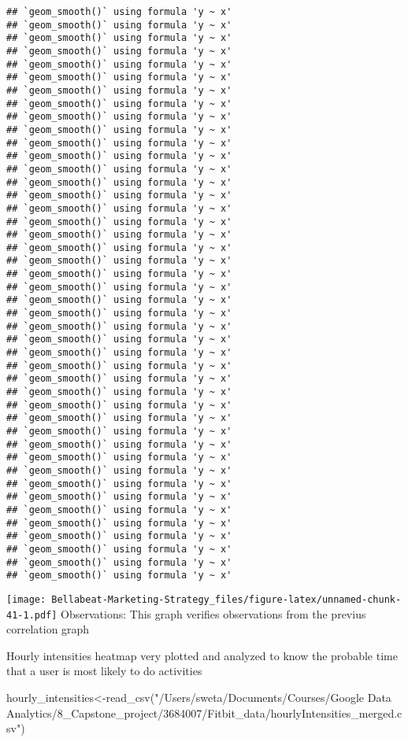 \documentclass[
]{article}
\newenvironment{Shaded}{\begin{snugshade}}{\end{snugshade}}
\newcommand{\FunctionTok}[1]{\textcolor[rgb]{0.00,0.00,0.00}{#1}}
\newcommand{\NormalTok}[1]{#1}
\newcommand{\OtherTok}[1]{\textcolor[rgb]{0.56,0.35,0.01}{#1}}
\newcommand{\StringTok}[1]{\textcolor[rgb]{0.31,0.60,0.02}{#1}}
\begin{document}
\begin{verbatim}
## `geom_smooth()` using formula 'y ~ x'
## `geom_smooth()` using formula 'y ~ x'
## `geom_smooth()` using formula 'y ~ x'
## `geom_smooth()` using formula 'y ~ x'
## `geom_smooth()` using formula 'y ~ x'
## `geom_smooth()` using formula 'y ~ x'
## `geom_smooth()` using formula 'y ~ x'
## `geom_smooth()` using formula 'y ~ x'
## `geom_smooth()` using formula 'y ~ x'
## `geom_smooth()` using formula 'y ~ x'
## `geom_smooth()` using formula 'y ~ x'
## `geom_smooth()` using formula 'y ~ x'
## `geom_smooth()` using formula 'y ~ x'
## `geom_smooth()` using formula 'y ~ x'
## `geom_smooth()` using formula 'y ~ x'
## `geom_smooth()` using formula 'y ~ x'
## `geom_smooth()` using formula 'y ~ x'
## `geom_smooth()` using formula 'y ~ x'
## `geom_smooth()` using formula 'y ~ x'
## `geom_smooth()` using formula 'y ~ x'
## `geom_smooth()` using formula 'y ~ x'
## `geom_smooth()` using formula 'y ~ x'
## `geom_smooth()` using formula 'y ~ x'
## `geom_smooth()` using formula 'y ~ x'
## `geom_smooth()` using formula 'y ~ x'
## `geom_smooth()` using formula 'y ~ x'
## `geom_smooth()` using formula 'y ~ x'
## `geom_smooth()` using formula 'y ~ x'
## `geom_smooth()` using formula 'y ~ x'
## `geom_smooth()` using formula 'y ~ x'
## `geom_smooth()` using formula 'y ~ x'
## `geom_smooth()` using formula 'y ~ x'
## `geom_smooth()` using formula 'y ~ x'
## `geom_smooth()` using formula 'y ~ x'
## `geom_smooth()` using formula 'y ~ x'
## `geom_smooth()` using formula 'y ~ x'
## `geom_smooth()` using formula 'y ~ x'
## `geom_smooth()` using formula 'y ~ x'
## `geom_smooth()` using formula 'y ~ x'
## `geom_smooth()` using formula 'y ~ x'
## `geom_smooth()` using formula 'y ~ x'
## `geom_smooth()` using formula 'y ~ x'
## `geom_smooth()` using formula 'y ~ x'
## `geom_smooth()` using formula 'y ~ x'
\end{verbatim}

\texttt{[image: Bellabeat-Marketing-Strategy\_files/figure-latex/unnamed-chunk-41-1.pdf]}
Observations: This graph verifies observations from the previus
correlation graph

Hourly intensities heatmap very plotted and analyzed to know the
probable time that a user is most likely to do activities

\begin{Shaded}
\begin{Highlighting}[]
\NormalTok{hourly\_intensities}\OtherTok{\textless{}{-}}\FunctionTok{read\_csv}\NormalTok{(}\StringTok{"/Users/sweta/Documents/Courses/Google Data Analytics/8\_Capstone\_project/3684007/Fitbit\_data/hourlyIntensities\_merged.csv"}\NormalTok{)}
\end{Highlighting}
\end{Shaded}
\end{document}
